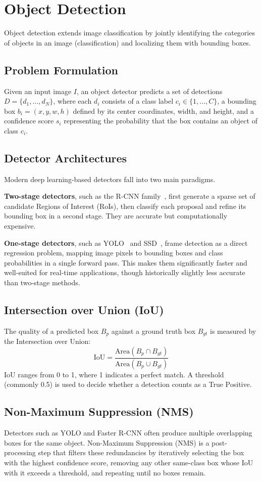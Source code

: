 \section{Object Detection}
\label{sec:object_detection}

Object detection extends image classification by jointly identifying the categories of objects in an image (classification) and localizing them with bounding boxes.

\subsection{Problem Formulation}
Given an input image $I$, an object detector predicts a set of detections $D = \{d_1, ..., d_N\}$, where each $d_i$ consists of a class label $c_i \in \{1, ..., C\}$, a bounding box $b_i = (x, y, w, h)$ defined by its center coordinates, width, and height, and a confidence score $s_i$ representing the probability that the box contains an object of class $c_i$.

\subsection{Detector Architectures}
Modern deep learning-based detectors fall into two main paradigms.

\textbf{Two-stage detectors}, such as the R-CNN family~\cite{rcnn,fastrcnn,fasterrcnn}, first generate a sparse set of candidate Regions of Interest (RoIs), then classify each proposal and refine its bounding box in a second stage. They are accurate but computationally expensive.

\textbf{One-stage detectors}, such as YOLO~\cite{YOLO} and SSD~\cite{ssd}, frame detection as a direct regression problem, mapping image pixels to bounding boxes and class probabilities in a single forward pass. This makes them significantly faster and well-suited for real-time applications, though historically slightly less accurate than two-stage methods.

\subsection{Intersection over Union (IoU)}
The quality of a predicted box $B_p$ against a ground truth box $B_{gt}$ is measured by the Intersection over Union:
\begin{equation}
    \text{IoU} = \frac{\text{Area}(B_p \cap B_{gt})}{\text{Area}(B_p \cup B_{gt})}
\end{equation}
IoU ranges from 0 to 1, where 1 indicates a perfect match. A threshold (commonly 0.5) is used to decide whether a detection counts as a True Positive.

\subsection{Non-Maximum Suppression (NMS)}
Detectors such as YOLO and Faster R-CNN often produce multiple overlapping boxes for the same object. Non-Maximum Suppression (NMS) is a post-processing step that filters these redundancies by iteratively selecting the box with the highest confidence score, removing any other same-class box whose IoU with it exceeds a threshold, and repeating until no boxes remain.